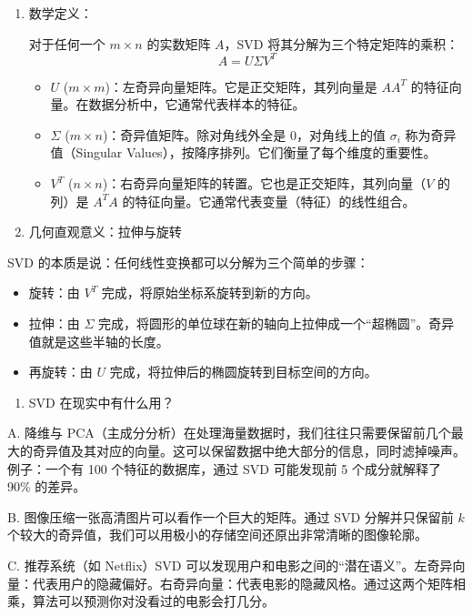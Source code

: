 \documentclass[
]{book}
\providecommand{\tightlist}{%
  \setlength{\itemsep}{0pt}\setlength{\parskip}{0pt}}
\begin{document}
\begin{enumerate}
\def\labelenumi{\arabic{enumi}.}
\item
  数学定义：

  对于任何一个 \(m \times n\) 的实数矩阵 \(A\)，SVD 将其分解为三个特定矩阵的乘积：\[A = U \Sigma V^T\]

  \begin{itemize}
  \item
    \(U\) (\(m \times m\))：左奇异向量矩阵。它是正交矩阵，其列向量是 \(AA^T\) 的特征向量。在数据分析中，它通常代表样本的特征。
  \item
    \(\Sigma\) (\(m \times n\))：奇异值矩阵。除对角线外全是 0，对角线上的值 \(\sigma_i\) 称为奇异值（Singular Values），按降序排列。它们衡量了每个维度的重要性。
  \item
    \(V^T\) (\(n \times n\))：右奇异向量矩阵的转置。它也是正交矩阵，其列向量（\(V\) 的列）是 \(A^TA\) 的特征向量。它通常代表变量（特征）的线性组合。
  \end{itemize}
\item
  几何直观意义：拉伸与旋转
\end{enumerate}

SVD 的本质是说：任何线性变换都可以分解为三个简单的步骤：

\begin{itemize}
\item
  旋转：由 \(V^T\) 完成，将原始坐标系旋转到新的方向。
\item
  拉伸：由 \(\Sigma\) 完成，将圆形的单位球在新的轴向上拉伸成一个``超椭圆''。奇异值就是这些半轴的长度。
\item
  再旋转：由 \(U\) 完成，将拉伸后的椭圆旋转到目标空间的方向。
\end{itemize}

\begin{enumerate}
\def\labelenumi{\arabic{enumi}.}
\setcounter{enumi}{2}
\tightlist
\item
  SVD 在现实中有什么用？
\end{enumerate}

A. 降维与 PCA（主成分分析）在处理海量数据时，我们往往只需要保留前几个最大的奇异值及其对应的向量。这可以保留数据中绝大部分的信息，同时滤掉噪声。例子：一个有 100 个特征的数据库，通过 SVD 可能发现前 5 个成分就解释了 90\% 的差异。

B. 图像压缩一张高清图片可以看作一个巨大的矩阵。通过 SVD 分解并只保留前 \(k\) 个较大的奇异值，我们可以用极小的存储空间还原出非常清晰的图像轮廓。

C. 推荐系统（如 Netflix）SVD 可以发现用户和电影之间的``潜在语义''。左奇异向量：代表用户的隐藏偏好。右奇异向量：代表电影的隐藏风格。通过这两个矩阵相乘，算法可以预测你对没看过的电影会打几分。
\end{document}
